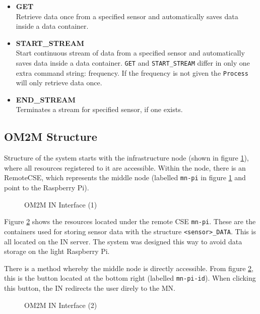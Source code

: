 \begin{itemize}
  \item \textbf{GET}\\
  Retrieve data once from a specified sensor and automatically saves data inside a data container. 
  \item \textbf{START\_STREAM}\\
  Start continuous stream of data from a specified sensor and automatically saves data inside a data container. \lstinline{GET} and \lstinline{START_STREAM} differ in only one extra command string: frequency. If the frequency is not given the \lstinline{Process} will only retrieve data once.
  \item \textbf{END\_STREAM}\\
  Terminates a stream for specified sensor, if one exists.
\end{itemize}

\subsection{OM2M Structure}

Structure of the system starts with the infrastructure node (shown in figure \ref{fig:OM2MInterface}), where all resources registered to it are accessible. Within the node, there is an RemoteCSE, which represents the middle node (labelled \lstinline{mn-pi} in figure \ref{fig:OM2MInterface} and point to the Raspberry Pi). 

\begin{figure}[H]
  \centering
  \caption{OM2M IN Interface (1)}
  \label{fig:OM2MInterface}
\end{figure}

Figure \ref{fig:OM2MInterface2} shows the resources located under the remote CSE \lstinline{mn-pi}. These are the containers used for storing sensor data with the structure \lstinline{<sensor>_DATA}. This is all located on the IN server. The system was designed this way to avoid data storage on the light Raspberry Pi. 

There is a method whereby the middle node is directly accessible. From figure \ref{fig:OM2MInterface2}, this is the button located at the bottom right (labelled \lstinline{mn-pi-id}). When clicking this button, the IN redirects the user direly to the MN. 

\begin{figure}[H]
  \centering
  \caption{OM2M IN Interface (2)}
  \label{fig:OM2MInterface2}
\end{figure}

